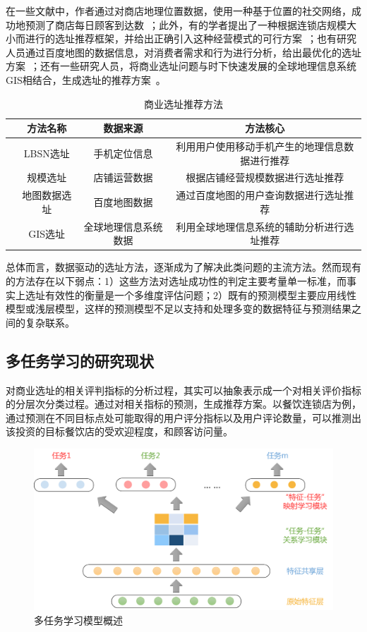 \documentclass{llncs}
\begin{document}
在一些文献中，作者通过对商店地理位置数据，使用一种基于位置的社交网络，成功地预测了商店每日顾客到达数~\cite{LBSN}；此外，有的学者提出了一种根据连锁店规模大小而进行的选址推荐框架，并给出正确引入这种经营模式的可行方案~\cite{chainDev}；也有研究人员通过百度地图的数据信息，对消费者需求和行为进行分析，给出最优化的选址方案~\cite{DengYue}；还有一些研究人员，将商业选址问题与时下快速发展的全球地理信息系统GIS相结合，生成选址的推荐方案~\cite{HeJiexin}。

\begin{table}[!hpt]
	\centering
	\caption{商业选址推荐方法}
	\label{tb:reco-method}
	\begin{tabular}{cc|c|c}
		\hline
		& \textbf{方法名称}  & \textbf{数据来源} & \textbf{方法核心}  \\ \hline
		& LBSN选址 & 手机定位信息  & 利用用户使用移动手机产生的地理信息数据进行推荐       \\ %
		& 规模选址   & 店铺运营数据     & 根据店铺经营规模数据进行选址推荐                                \\ %
		& 地图数据选址  & 百度地图数据  & 通过百度地图的用户查询数据进行选址推荐                                \\ %
		& GIS选址  & 全球地理信息系统数据 & 利用全球地理信息系统的辅助分析进行选址推荐                  \\ \hline
	\end{tabular}
\end{table}

总体而言，数据驱动的选址方法，逐渐成为了解决此类问题的主流方法。然而现有的方法存在以下弱点：1）这些方法对选址成功性的判定主要考量单一标准，而事实上选址有效性的衡量是一个多维度评估问题；2）既有的预测模型主要应用线性模型或浅层模型，这样的预测模型不足以支持和处理多变的数据特征与预测结果之间的复杂联系。
\subsection{多任务学习的研究现状}
对商业选址的相关评判指标的分析过程，其实可以抽象表示成一个对相关评价指标的分层次分类过程。通过对相关指标的预测，生成推荐方案。以餐饮连锁店为例，通过预测在不同目标点处可能取得的用户评分指标以及用户评论数量，可以推测出该投资的目标餐饮店的受欢迎程度，和顾客访问量。

\begin{figure}
	\centering
	\includegraphics[width=0.8\columnwidth]{figures/multiLearn.png}
	\caption{多任务学习模型概述}
	\label{MTLmodel}
\end{figure}
\end{document}
